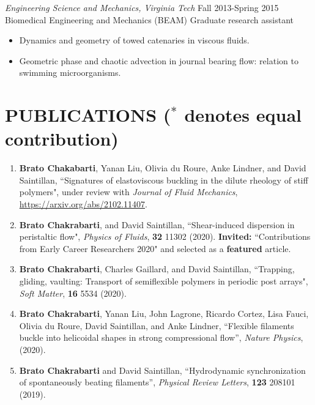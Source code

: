 \documentclass[10pt]{res} %
\begin{document}
\begin{resume}
{\sl Engineering Science and Mechanics, Virginia Tech} \hfill Fall 2013-Spring 2015\\[2pt]
Biomedical Engineering and Mechanics (BEAM) \hfill Graduate research assistant
\vspace*{2mm}
\begin{itemize} \itemsep -2pt %
\item Dynamics and geometry of towed catenaries in viscous fluids. 
\item Geometric phase and chaotic advection in journal bearing flow: relation to swimming microorganisms.
\end{itemize} 
 




\section{{PUBLICATIONS} {($^*$ denotes equal contribution)} }
\vspace*{6mm}
\begin{enumerate}
	\item \textbf{Brato Chakabarti}, Yanan Liu, Olivia du Roure, Anke Lindner, and David Saintillan, ``Signatures of elastoviscous buckling in the dilute rheology of stiff polymers", under review with \textit{Journal of Fluid Mechanics}, \url{https://arxiv.org/abs/2102.11407}.
	
	
	\item \textbf{Brato Chakrabarti}, and David Saintillan, ``Shear-induced dispersion in peristaltic flow", \textit{Physics of Fluids}, \textbf{32} 11302 (2020).  \textbf{Invited:} ``Contributions from Early Career Researchers 2020" and selected as a \textbf{featured} article.
		
	\item \textbf{Brato Chakrabarti}, Charles Gaillard, and David Saintillan, ``Trapping, gliding, vaulting: Transport of semiflexible polymers in periodic post arrays", \textit{Soft Matter}, \textbf{16} 5534 (2020).
		
	
	\item \textbf{Brato Chakrabarti}, Yanan Liu, John Lagrone, Ricardo Cortez, Lisa Fauci, Olivia du Roure, David Saintillan, and Anke Lindner, ``Flexible filaments buckle into helicoidal shapes in strong compressional flow'',  \textit{Nature Physics}, (2020).
	
   \item \textbf{Brato Chakrabarti} and David Saintillan, ``Hydrodynamic synchronization of spontaneously beating filaments'', \textit{Physical Review Letters}, \textbf{123} 208101 (2019). 
 

\end{enumerate}
\end{resume}
\end{document}
